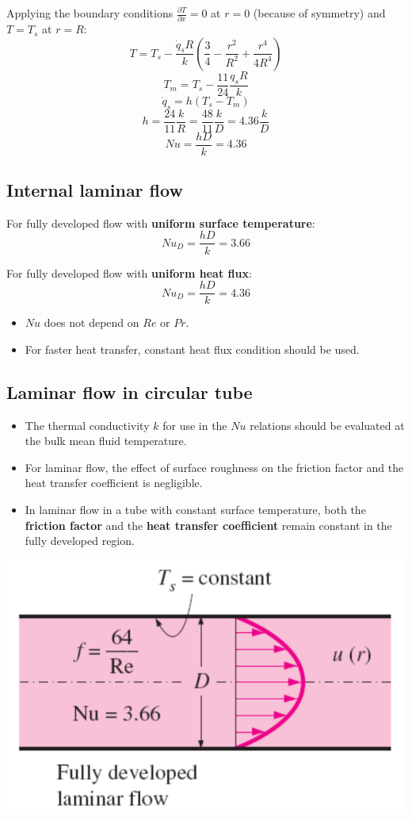\documentclass[11pt]{article}
\begin{document}
Applying the boundary conditions \(\frac{\partial T}{\partial x} = 0\) at \(r = 0\) (because of symmetry) and \(T = T_s\) at \(r = R\):
\[T = T_s - \frac{\dot{q}_s R}{k} \left(\frac{3}{4} - \frac{r^2}{R^2} + \frac{r^4}{4R^4} \right)\]
\[T_m = T_s - \frac{11}{24} \frac{{q}_s R}{k}\]
\[\dot{q}_s = h(T_s - T_m)\]
\[h = \frac{24}{11} \frac{k}{R} = \frac{48}{11} \frac{k}{D} = 4.36 \frac{k}{D}\]
\[Nu = \frac{hD}{k} = 4.36\]

\subsection{Internal laminar flow}
\label{sec:org1c9037a}
For fully developed flow with \textbf{uniform surface temperature}:
\[Nu_D = \frac{hD}{k} = 3.66\]

For fully developed flow with \textbf{uniform heat flux}:
\[Nu_D = \frac{hD}{k} = 4.36\]

\begin{itemize}
\item \(Nu\) does not depend on \(Re\) or \(Pr\).
\item For faster heat transfer, constant heat flux condition should be used.
\end{itemize}

\subsection{Laminar flow in circular tube}
\label{sec:orgcccfca1}
\begin{itemize}
\item The thermal conductivity \(k\) for use in the \(Nu\) relations should be evaluated at the bulk mean fluid temperature.
\item For laminar flow, the effect of surface roughness on the friction factor and the heat transfer coefficient is negligible.
\item In laminar flow in a tube with constant surface temperature, both the \textbf{friction factor} and the \textbf{heat transfer coefficient} remain constant in the fully developed region.
\end{itemize}

\begin{center}
\includegraphics[width=.9\linewidth]{./images/laminar-flow-in-circular-tube-diagram.png}
\end{center}
\end{document}
